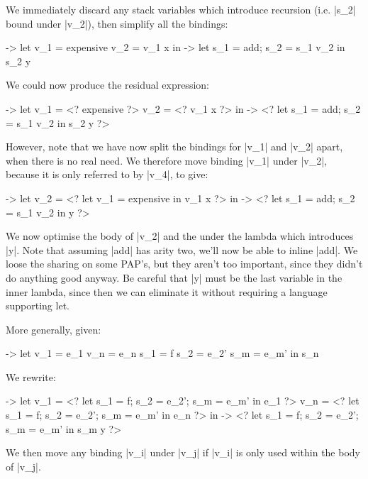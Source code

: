 \documentclass[draft]{sigplanconf}
\begin{document}
We immediately discard any stack variables which introduce recursion (i.e. |s_2| bound under |v_2|), then simplify all the bindings:

\begin{code}
\x ->  let  v_1 =  expensive
            v_2 =  v_1 x
       in   \y ->  let s_1 = add; s_2 = s_1 v_2 in s_2 y
\end{code}

We could now produce the residual expression:

\begin{code}
\x ->  let  v_1 =  <? expensive ?>
            v_2 =  <? v_1 x ?>
       in   \y ->  <? let s_1 = add; s_2 = s_1 v_2 in s_2 y ?>
\end{code}

However, note that we have now split the bindings for |v_1| and |v_2| apart, when there is no real need. We therefore move binding |v_1| under |v_2|, because it is only referred to by |v_4|, to give:

\begin{code}
\x ->  let  v_2 =  <? let v_1 = expensive in v_1 x ?>
       in   \y ->  <? let s_1 = add; s_2 = s_1 v_2 in y ?>
\end{code}

We now optimise the body of |v_2| and the under the lambda which introduces |y|. Note that assuming |add| has arity two, we'll now be able to inline |add|. We loose the sharing on some PAP's, but they aren't too important, since they didn't do anything good anyway. Be careful that |y| must be the last variable in the inner lambda, since then we can eliminate it without requiring a language supporting let.

More generally, given:

\begin{code}
\free ->  let  v_1  = e_1
               v_n  = e_n
               s_1  = f
               s_2  = e_2'
               s_m  = e_m'
          in   s_n
\end{code}

We rewrite:

\begin{code}
\free ->  let  v_1 =  <? let s_1 = f; s_2 = e_2'; s_m = e_m' in e_1 ?>
               v_n =  <? let s_1 = f; s_2 = e_2'; s_m = e_m' in e_n ?>
          in   \y ->  <? let s_1 = f; s_2 = e_2'; s_m = e_m' in s_m y ?>
\end{code}

We then move any binding |v_i| under |v_j| if |v_i| is only used within the body of |v_j|.
\end{document}
